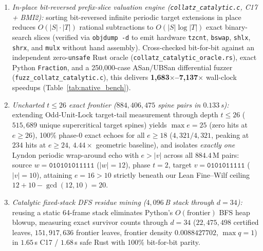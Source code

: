 \documentclass[11pt,reqno]{amsart}
\theoremstyle{plain}
\theoremstyle{definition}
\newcommand{\code}[1]{{\upshape\nolinkurl{#1}}}
\begin{document}
\begin{enumerate}
  \item \emph{In-place bit-reversed prefix-slice valuation engine (\code{collatz_catalytic.c}, C17 + BMI2):}
    sorting bit-reversed infinite periodic target extensions in place reduces $O(|S|\cdot|T|)$ rational
    subtractions to $O(|S|\log|T|)$ exact binary-search slices (verified via \code{objdump -d} to emit
    hardware \code{tzcnt}, \code{bswap}, \code{shlx}, \code{shrx}, and \code{mulx} without hand assembly).
    Cross-checked bit-for-bit against an independent zero-\code{unsafe} Rust oracle
    (\code{collatz_catalytic_oracle.rs}), exact Python \code{Fraction}, and a 250,000-case ASan/UBSan
    differential fuzzer (\code{fuzz_collatz_catalytic.c}), this delivers \textbf{1,683$\times$--7,137$\times$}
    wall-clock speedups (Table~\ref{tab:native_bench}).
  \item \emph{Uncharted $t \le 26$ exact frontier ($884{,}406{,}475$ spine pairs in $0.133$\,s):}
    extending Odd-Unit-Lock target-tail measurement through depth $t \le 26$ ($515{,}689$ unique
    supercritical target spines) yields $\max e = 25$ (zero hits at $e \ge 26$), 100\% phase-0 exact
    echoes for all $e \ge 18$ ($4{,}321/4{,}321$, peaking at $234$ hits at $e \ge 24$, $4.44\times$
    geometric baseline), and isolates \emph{exactly one} Lyndon periodic wrap-around echo with
    $e > |v|$ across all $884.4$\,M pairs: source $w = \texttt{010101011111}$ ($|w|=12$), phase $t=2$,
    target $v = \texttt{0101011111}$ ($|v|=10$), attaining $e = 16 > 10$ strictly beneath our Lean
    Fine--Wilf ceiling $12 + 10 - \gcd(12,10) = 20$.
  \item \emph{Catalytic fixed-stack DFS residue mining ($4{,}096$\,B stack through $d = 34$):}
    reusing a static 64-frame stack eliminates Python's $O(\text{frontier})$ BFS heap blowup,
    measuring exact survivor counts through $d = 34$ ($22{,}475{,}498$ certified leaves,
    $151{,}917{,}636$ frontier leaves, frontier density $0.0088427702$, $\max q = 1$) in $1.65$\,s
    C17 / $1.68$\,s safe Rust with 100\% bit-for-bit parity.
\end{enumerate}
\end{document}
